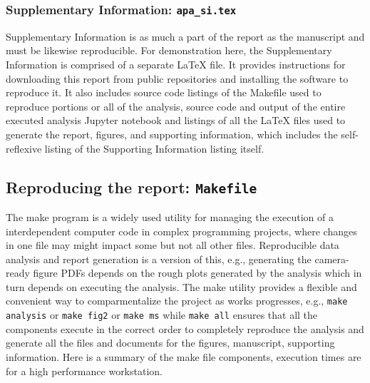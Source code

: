 \documentclass[helv,10pt,man,floatsintext]{apa6}  %
\begin{document}
\subsubsection{Supplementary Information: \texttt{apa_si.tex}}

Supplementary Information is as much a part of the report as the
manuscript and must be likewise reproducible. For demonstration here,
the Supplementary Information is comprised of a separate \LaTeX{}
file.  It provides instructions for downloading this report from
public repositories and installing the software to reproduce it. It
also includes source code listings of the Makefile used to reproduce
portions or all of the analysis, source code and output of the entire
executed analysis Jupyter notebook and listings of all the \LaTeX{}
files used to generate the report, figures, and supporting
information, which includes the self-reflexive listing of the
Supporting Information listing itself.


\subsection{Reproducing the report: \texttt{Makefile}}

The make program is a widely used utility for managing the execution
of a interdependent computer code in complex programming projects,
where changes in one file may might impact some but not all other
files. Reproducible data analysis and report generation is a version
of this, e.g., generating the camera-ready figure PDFs depends on the
rough plots generated by the analysis which in turn depends on
executing the analysis. The make utility provides a flexible and
convenient way to comparmentalize the project as works progresses,
e.g., \texttt{make analysis} or \texttt{make fig2}
or \texttt{make ms} while \texttt{make all}
ensures that all the components execute in the correct order to
completely reproduce the analysis and generate all the files and
documents for the figures, manuscript, supporting information. Here is
a summary of the make file components, execution times are for a high
performance workstation.
\end{document}
